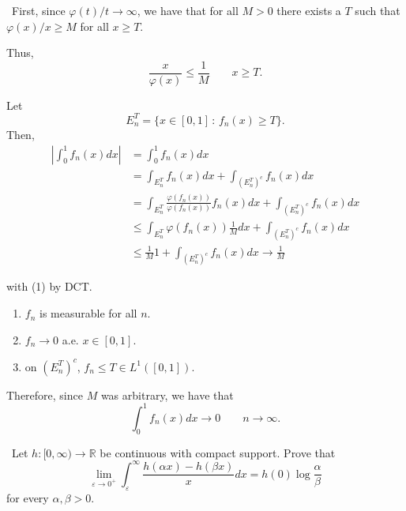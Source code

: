 \documentclass[12pt]{Homework}
\begin{document}
\begin{solution}$\,$
First, since $\varphi(t)/t\to\infty$, we have that for all $M>0$ there exists a $T$ such that $\varphi(x)/x\ge M$ for all $x\ge T.$

Thus, $$\frac{x}{\varphi(x)}\le\frac{1}{M}\qquad x\ge T.$$

Let $$E_n^T=\{x\in[0,1]\,:\,f_n(x)\ge T\}.$$ Then, \begin{align*}
    \left|\int_0^1f_n(x)dx\right|&=\int_0^1f_n(x)dx\\
    &=\int_{E_n^T}f_n(x)dx+\int_{(E_n^T)^c}f_n(x)dx\\
    &=\int_{E_n^T}\frac{\varphi(f_n(x))}{\varphi(f_n(x))}f_n(x)dx+\int_{(E_n^T)^c}f_n(x)dx\\
    &\le\int_{E_n^T}\varphi(f_n(x))\frac{1}{M}dx+\int_{(E_n^T)^c}f_n(x)dx\\
    &\le\frac{1}{M}1+\int_{(E_n^T)^c}f_n(x)dx\to\frac{1}{M}\tag{1}
\end{align*}

with (1) by DCT. \begin{enumerate}
    \item $f_n$ is measurable for all $n$.
    \item $f_n\to0$ a.e. $x\in[0,1]$.
    \item on $(E_n^T)^c$, $f_n\le T\in L^1([0,1])$.
\end{enumerate} 

Therefore, since $M$ was arbitrary, we have that $$\int_0^1f_n(x)dx\to0\qquad n\to\infty.$$
\end{solution}
\newpage



\begin{problem} $\,$
Let $h:[0,\infty)\to\mathbb{R}$ be continuous with compact support. Prove that $$\lim_{\varepsilon\to0^+}\int_\varepsilon^\infty\frac{h(\alpha x)-h(\beta x)}{x}dx=h(0)\log\frac{\alpha}{\beta}$$ for every $\alpha,\beta>0.$
\end{problem}
\end{document}
